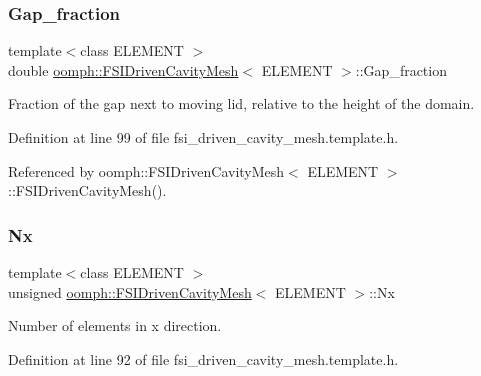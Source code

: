 \subsubsection{\texorpdfstring{Gap\+\_\+fraction}{Gap\_fraction}}
{\footnotesize\ttfamily template$<$class E\+L\+E\+M\+E\+NT $>$ \\
double \hyperlink{classoomph_1_1FSIDrivenCavityMesh}{oomph\+::\+F\+S\+I\+Driven\+Cavity\+Mesh}$<$ E\+L\+E\+M\+E\+NT $>$\+::Gap\+\_\+fraction\hspace{0.3cm}{\ttfamily [protected]}}



Fraction of the gap next to moving lid, relative to the height of the domain. 



Definition at line 99 of file fsi\+\_\+driven\+\_\+cavity\+\_\+mesh.\+template.\+h.



Referenced by oomph\+::\+F\+S\+I\+Driven\+Cavity\+Mesh$<$ E\+L\+E\+M\+E\+N\+T $>$\+::\+F\+S\+I\+Driven\+Cavity\+Mesh().

\mbox{\label{classoomph_1_1FSIDrivenCavityMesh_a179f742e7bb521e8943107be3005d49b}} 
\subsubsection{\texorpdfstring{Nx}{Nx}}
{\footnotesize\ttfamily template$<$class E\+L\+E\+M\+E\+NT $>$ \\
unsigned \hyperlink{classoomph_1_1FSIDrivenCavityMesh}{oomph\+::\+F\+S\+I\+Driven\+Cavity\+Mesh}$<$ E\+L\+E\+M\+E\+NT $>$\+::Nx\hspace{0.3cm}{\ttfamily [protected]}}



Number of elements in x direction. 



Definition at line 92 of file fsi\+\_\+driven\+\_\+cavity\+\_\+mesh.\+template.\+h.

\mbox{\label{classoomph_1_1FSIDrivenCavityMesh_af80a5662c2f61ebe49caba4ab08886b9}} 
